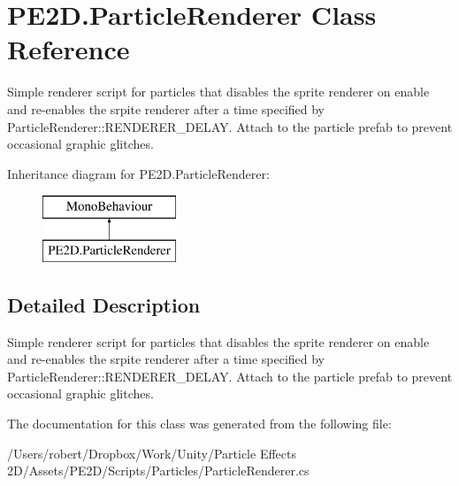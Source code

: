 \hypertarget{class_p_e2_d_1_1_particle_renderer}{}\section{P\+E2\+D.\+Particle\+Renderer Class Reference}
\label{class_p_e2_d_1_1_particle_renderer}


Simple renderer script for particles that disables the sprite renderer on enable and re-\/enables the srpite renderer after a time specified by Particle\+Renderer\+::\+R\+E\+N\+D\+E\+R\+E\+R\+\_\+\+D\+E\+L\+A\+Y. Attach to the particle prefab to prevent occasional graphic glitches.  


Inheritance diagram for P\+E2\+D.\+Particle\+Renderer\+:\begin{figure}[H]
\begin{center}
\leavevmode
\includegraphics[height=2.000000cm]{class_p_e2_d_1_1_particle_renderer}
\end{center}
\end{figure}


\subsection{Detailed Description}
Simple renderer script for particles that disables the sprite renderer on enable and re-\/enables the srpite renderer after a time specified by Particle\+Renderer\+::\+R\+E\+N\+D\+E\+R\+E\+R\+\_\+\+D\+E\+L\+A\+Y. Attach to the particle prefab to prevent occasional graphic glitches. 



The documentation for this class was generated from the following file\+:\begin{DoxyCompactItemize}
\item 
/\+Users/robert/\+Dropbox/\+Work/\+Unity/\+Particle Effects 2\+D/\+Assets/\+P\+E2\+D/\+Scripts/\+Particles/Particle\+Renderer.\+cs\end{DoxyCompactItemize}
